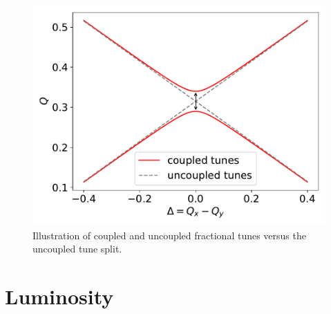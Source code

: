 \begin{figure}[!htb]
    \begin{center}
    \includegraphics[width = 0.9\linewidth]{Figures/Chapter2/tune_perturbation.pdf}
    \caption{Illustration of coupled and uncoupled fractional tunes versus the uncoupled tune split.}
    \label{fig:closest_tune_approach}
    \end{center}
\end{figure}


\section{Luminosity}

